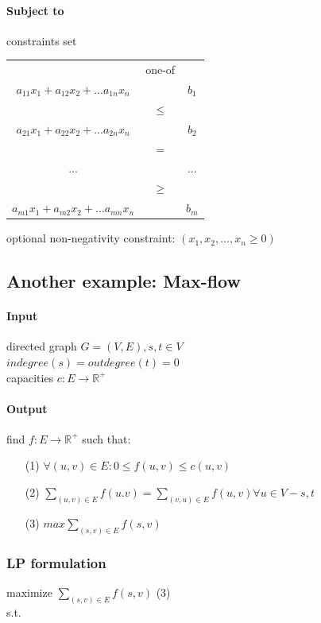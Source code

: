 \paragraph{Subject to} constraints set \\
\begin{center}
\begin{tabular}{c|c|c}
	& one-of & \\
	$a_{11}x_1+a_{12}x_2+...a_{1n}x_n$ &  & $b_1$ \\ 
	& $\leq$ & \\
	$a_{21}x_1+a_{22}x_2+...a_{2n}x_n$ & & $b_2$ \\
	& $=$ & \\
	... & & ... \\
	& $\geq$ & \\
	$a_{m1}x_1+a_{m2}x_2+...a_{mn}x_n$ & & $b_m$ \\
\end{tabular}
\end{center}
optional non-negativity constraint: $(x_1,x_2,...,x_n \geq 0)$ 

\subsection{Another example: Max-flow}
\paragraph{Input} directed graph $G=(V,E),s,t \in V$ \\
$indegree(s) = outdegree(t) = 0$ \\
capacities $c: E \rightarrow \mathbb{R}^+$
\paragraph{Output} find $f: E \rightarrow \mathbb{R}^+$ such that:
\begin{itemize}
	\item[(1)] $\forall(u,v) \in E: 0 \leq f(u,v) \leq c(u,v)$
	\item[(2)] $\sum_{(u,v) \in E}f(u.v) = \sum_{(v,u) \in E}f(u,v) \forall u \in V-{s,t}$
	\item[(3)] $max \sum_{(s,v) \in E}f(s,v)$
\end{itemize}
\subsubsection{LP formulation}
maximize $\sum_{(s,v) \in E}f(s,v)$ (3) \\
s.t.
